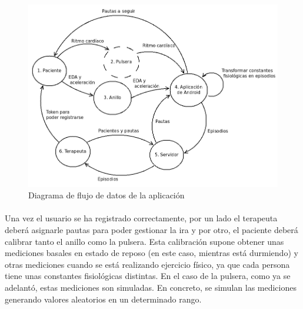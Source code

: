 \begin{figure}[H]
    \centering
    \includegraphics[scale=0.5]{Imagenes/04DescProblema/dfd-all.png}
    \caption[Diagrama de flujo de datos de la aplicación]{Diagrama de flujo de datos de la aplicación}
    \label{c4:fig:dfd}
\end{figure}


\paragraph{}
Una vez el usuario se ha registrado correctamente, por un lado el terapeuta deberá asignarle pautas para poder gestionar la ira y por otro, el paciente deberá calibrar tanto el anillo como la pulsera. Esta calibración supone obtener unas mediciones basales en estado de reposo (en este caso, mientras está durmiendo) y otras mediciones cuando se está realizando ejercicio físico, ya que cada persona tiene unas constantes fisiológicas distintas. En el caso de la pulsera, como ya se adelantó, estas mediciones son simuladas. En concreto, se simulan las mediciones generando valores aleatorios en un determinado rango.

